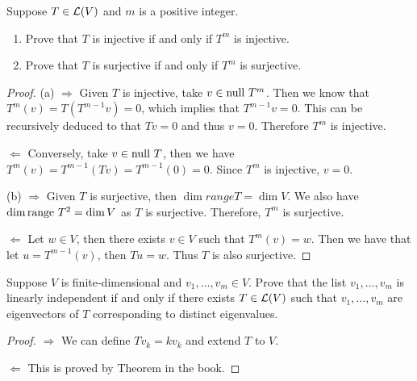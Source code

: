 \documentclass{extarticle}
\begin{document}





\begin{problem}{33}
    Suppose \(T \in \mathcal{L}(V)\) and \(m\) is a positive integer. 
    \begin{enumerate}[label=(\alph*)]
        \item Prove that \(T\) is injective if and only if \(T^m\) is injective. 
        \item Prove that \(T\) is surjective if and only if \(T^m\) is surjective.
    \end{enumerate}
\end{problem}

\begin{proof}
(a) \(\Rightarrow\) Given \(T\) is injective, take \(v \in \text{null } T^m\). Then we know that 
\(T^m(v) = T(T^{m-1}v) = 0\), which implies that \(T^{m-1}v = 0\). This can be recursively 
deduced to that \(Tv = 0\) and thus \(v = 0\). Therefore \(T^m\) is injective. 

\(\Leftarrow\) Conversely, take \(v \in \text{null } T\), then we have \(T^m(v)
=T^{m-1}(Tv) = T^{m-1}(0) = 0\). Since \(T^m\) is injective, \(v=0\). 

(b) \(\Rightarrow\) Given \(T\) is surjective, then \(\dim range T = \dim V\). We also have 
\(\dim \text{range } T^2 = \dim V\) as \(T\) is surjective. Therefore, \(T^m\) is surjective. 

\(\Leftarrow\) Let \(w \in V\), then there exists \(v \in V\) such that \(T^m(v) = w\). Then 
we have that let \(u = T^{m-1}(v)\), then \(Tu = w\). Thus \(T\) is also surjective.  
\end{proof}



\begin{problem}{34}
    Suppose \(V\) is finite-dimensional and \(v_1, \ldots, v_m \in V\). Prove that 
    the list \(v_1, \ldots, v_m\) is linearly independent if and only if there 
    exists \(T \in \mathcal{L}(V)\) such that \(v_1, \ldots, v_m\) are eigenvectors of \(T\)
    corresponding to distinct eigenvalues. 
\end{problem}

\begin{proof}
\(\Rightarrow\) We can define \(Tv_k = k v_k\) and extend \(T\) to \(V\). 

\(\Leftarrow\) This is proved by Theorem in the book.
\end{proof}
\end{document}
